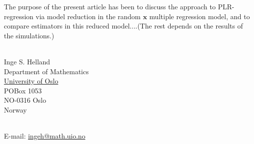 \documentclass[a4paper, 11pt]{article}
\begin{document}
The purpose of the present article has been to discuss the approach to PLR-regression via model reduction in the random $\bm{x}$ multiple regression model, and to compare estimators in this reduced model....(The rest depends on the results of the simulations.)



\bigskip

\ \\
Inge S. Helland \\
Department of Mathematics \\
\href{http://uio.no}{University of Oslo} \\
POBox 1053 \\
NO-0316 Oslo \\
Norway

\ \\
E-mail: \href{mailto:ingeh@math.uio.no}{ingeh@math.uio.no}
\end{document}
